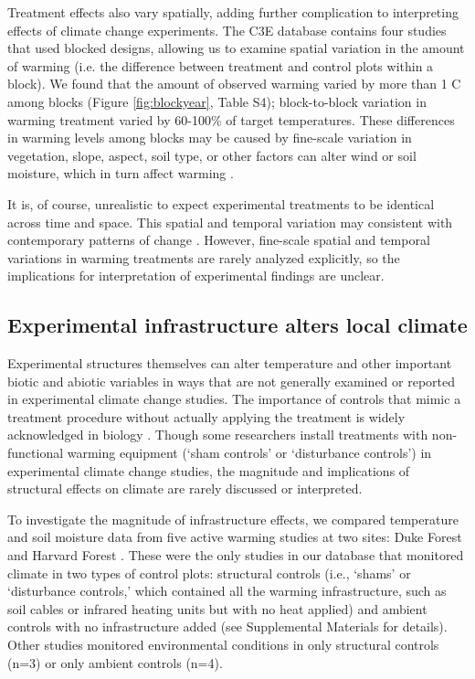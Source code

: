 \documentclass{article}
\begin{document}
\par Treatment effects also vary spatially, adding further complication to interpreting effects of climate change experiments. The C3E database contains four studies that used blocked designs, allowing us to examine spatial variation in the amount of warming (i.e. the difference between treatment and control plots within a block). We found that the amount of observed warming varied by more than 1 \degree C among blocks (Figure \ref{fig:blockyear}, Table S4); block-to-block variation in warming treatment varied by 60-100\% of target temperatures. These differences in warming levels among blocks may be caused by fine-scale variation in vegetation, slope, aspect, soil type, or other factors can alter wind or soil moisture, which in turn affect warming \citep{peterjohn1993,kimball2005,kimball2008,hoeppner2012,rollinson2015}. 
\par It is, of course, unrealistic to expect experimental treatments to be identical across time and space.  This spatial and temporal variation may consistent with contemporary patterns of change  \citep{ipcc2013}. However, fine-scale spatial and temporal variations in warming treatments are rarely analyzed explicitly, so the implications for interpretation of experimental findings are unclear. %

\subsection* {Experimental infrastructure alters local climate}
Experimental structures themselves can alter temperature and other important biotic and abiotic variables in ways that are not generally examined or reported in experimental climate change studies. The importance of controls that mimic a treatment procedure without actually applying the treatment is widely acknowledged in biology \citep[e.g.,][]{spector2001,johnson2002,quinn2002}. Though some researchers install treatments with non-functional warming equipment (`sham controls' or `disturbance controls') in experimental climate change studies, the magnitude and implications of structural effects on climate are rarely discussed or interpreted.
\par To investigate the magnitude of infrastructure effects, we compared temperature and soil moisture data from five active warming studies at two sites: Duke Forest and Harvard Forest \citep{farnsworth1995,clark2014a, marchin2015, pelini2011}. These were the only studies in our database that monitored climate in two types of control plots: structural controls (i.e., `shams' or `disturbance controls,' which contained all the warming infrastructure, such as soil cables or infrared heating units but with no heat applied) and ambient controls with no infrastructure added (see Supplemental Materials for details). Other studies monitored environmental conditions in only structural controls (n=3) or only ambient controls (n=4).
\end{document}
